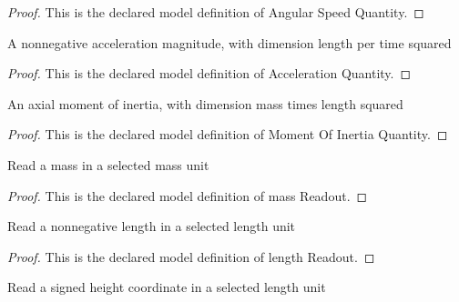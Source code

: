 \begin{proof}
  This is the declared model definition of Angular Speed Quantity.
\end{proof}
\begin{definition}
  \label{def:physics:phyx-mini-0713:phyxminiproblems-problemphyxmini0713-accelerationquantity}
  A nonnegative acceleration magnitude, with dimension length per time squared
\end{definition}
\begin{proof}
  This is the declared model definition of Acceleration Quantity.
\end{proof}
\begin{definition}
  \label{def:physics:phyx-mini-0713:phyxminiproblems-problemphyxmini0713-momentofinertiaquantity}
  An axial moment of inertia, with dimension mass times length squared
\end{definition}
\begin{proof}
  This is the declared model definition of Moment Of Inertia Quantity.
\end{proof}
\begin{definition}
  \label{def:physics:phyx-mini-0713:phyxminiproblems-problemphyxmini0713-massreadout}
  Read a mass in a selected mass unit
\end{definition}
\begin{proof}
  This is the declared model definition of mass Readout.
\end{proof}
\begin{definition}
  \label{def:physics:phyx-mini-0713:phyxminiproblems-problemphyxmini0713-lengthreadout}
  Read a nonnegative length in a selected length unit
\end{definition}
\begin{proof}
  This is the declared model definition of length Readout.
\end{proof}
\begin{definition}
  \label{def:physics:phyx-mini-0713:phyxminiproblems-problemphyxmini0713-heightreadout}
  Read a signed height coordinate in a selected length unit
\end{definition}
